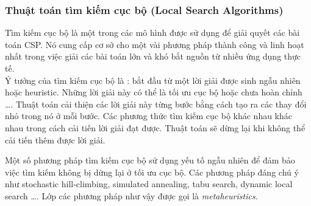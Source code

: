 \documentclass[a4paper,12pt]{report}
\begin{document}
\subsubsection{Thuật toán tìm kiếm cục bộ (Local Search Algorithms)}
Tìm kiếm cục bộ \cite{MTH} là một trong các mô hình được sử dụng để giải quyết các bài toán CSP. Nó cung cấp cơ sở cho một vài phương pháp thành công và linh hoạt nhất trong việc giải các bài toán lớn và khó bắt nguồn từ nhiều ứng dụng thực tế. \\

Ý tưởng của tìm kiếm cục bộ là : bắt đầu từ một lời giải được sinh ngẫu nhiên hoặc heuristic. Những lời giải này có thể là tối ưu cục bộ hoặc chưa hoàn chỉnh \dots. Thuật toán cải thiện các lời giải này từng bước bằng cách tạo ra các thay đổi nhỏ trong nó ở mỗi bước. Các phương thức tìm kiếm cục bộ khác nhau khác nhau trong cách cải tiến lời giải đạt được. Thuật toán sẽ dừng lại khi không thể cải tiến thêm được lời giải.

Một số phương pháp tìm kiếm cục bộ sử dụng yếu tố ngẫu nhiên để đảm bảo việc tìm kiếm không bị dừng lại ở tối ưu cục bộ. Các phương pháp đáng chú ý như stochastic hill-climbing, simulated annealing, tabu search, dynamic local search \dots. Lớp các phương pháp như vậy được gọi là \textit{metaheuristics}.


\end{document}
